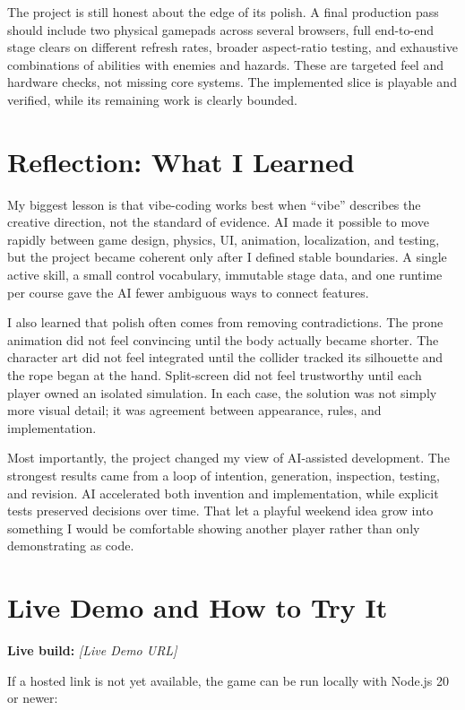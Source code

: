 \documentclass[11pt,letterpaper]{article}
\begin{document}
The project is still honest about the edge of its polish. A final production pass should include two physical gamepads across several browsers, full end-to-end stage clears on different refresh rates, broader aspect-ratio testing, and exhaustive combinations of abilities with enemies and hazards. These are targeted feel and hardware checks, not missing core systems. The implemented slice is playable and verified, while its remaining work is clearly bounded.

\section{Reflection: What I Learned}

My biggest lesson is that vibe-coding works best when ``vibe'' describes the creative direction, not the standard of evidence. AI made it possible to move rapidly between game design, physics, UI, animation, localization, and testing, but the project became coherent only after I defined stable boundaries. A single active skill, a small control vocabulary, immutable stage data, and one runtime per course gave the AI fewer ambiguous ways to connect features.

I also learned that polish often comes from removing contradictions. The prone animation did not feel convincing until the body actually became shorter. The character art did not feel integrated until the collider tracked its silhouette and the rope began at the hand. Split-screen did not feel trustworthy until each player owned an isolated simulation. In each case, the solution was not simply more visual detail; it was agreement between appearance, rules, and implementation.

Most importantly, the project changed my view of AI-assisted development. The strongest results came from a loop of intention, generation, inspection, testing, and revision. AI accelerated both invention and implementation, while explicit tests preserved decisions over time. That let a playful weekend idea grow into something I would be comfortable showing another player rather than only demonstrating as code.

\section{Live Demo and How to Try It}

\textbf{Live build:} \textit{[Live Demo URL]}

If a hosted link is not yet available, the game can be run locally with Node.js 20 or newer:
\end{document}
